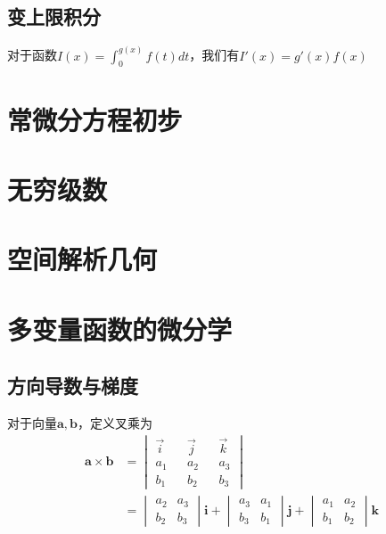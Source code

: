 \documentclass[lang=cn,10pt]{elegantbook}
\newcommand\bv[1]{\boldsymbol{#1}}
\begin{document}
\section{变上限积分}
\begin{theorem}
    对于函数$I(x)=\int_{0}^{g(x)}f(t)dt$，我们有$I'(x) = g'(x)f(x)$
\end{theorem}


\chapter{常微分方程初步}
\chapter{无穷级数}
\chapter{空间解析几何}
\chapter{多变量函数的微分学}
\section{方向导数与梯度}
\begin{definition}[叉乘]\label{de9.1}
    对于向量$\bv{a,b}$，定义叉乘为
    \begin{equation*}
        \begin{aligned}
            \bv{a}\times \bv{b} & =
            \begin{vmatrix}
                \vec{i} &  & \vec{j} &  & \vec{k} \\
                a_1     &  & a_2     &  & a_3     \\
                b_1     &  & b_2     &  & b_3
            \end{vmatrix} \\
                                & =
            \begin{vmatrix}
                a_2 & a_3 \\
                b_2 & b_3
            \end{vmatrix}
            \mathbf{i}+
            \begin{vmatrix}
                a_3 & a_1 \\
                b_3 & b_1
            \end{vmatrix}
            \mathbf{j}+
            \begin{vmatrix}
                a_1 & a_2 \\
                b_1 & b_2
            \end{vmatrix}
            \mathbf{k}
        \end{aligned}
    \end{equation*}
\end{definition}
\end{document}
